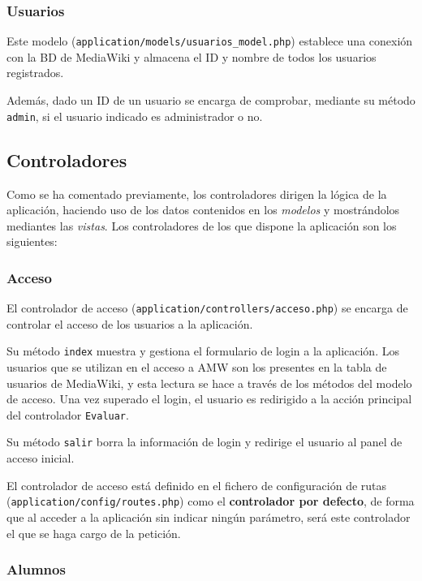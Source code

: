 \documentclass[11pt]{article}
\begin{document}
\subsubsection{Usuarios}

Este modelo (\texttt{application/models/usuarios\_model.php}) establece una
conexión con la BD de MediaWiki y almacena el ID y nombre de todos los usuarios
registrados.

Además, dado un ID de un usuario se encarga de comprobar, mediante su método
\texttt{admin}, si el usuario indicado es administrador o no.


\subsection{Controladores}

Como se ha comentado previamente, los controladores dirigen la lógica de la
aplicación, haciendo uso de los datos contenidos en los \textit{modelos} y
mostrándolos mediantes las \textit{vistas}. Los controladores de los que dispone
la aplicación son los siguientes:

\subsubsection{Acceso}

El controlador de acceso (\texttt{application/controllers/acceso.php}) se
encarga de controlar el acceso de los usuarios a la aplicación. 

Su método \texttt{index} muestra y gestiona el formulario de login a la
aplicación. Los usuarios que se utilizan en el acceso a AMW son los presentes en
la tabla de usuarios de MediaWiki, y esta lectura se hace a través de los
métodos del modelo de acceso. Una vez superado el login, el usuario es
redirigido a la acción principal del controlador \texttt{Evaluar}.

Su método \texttt{salir} borra la información de login y redirige el usuario al
panel de acceso inicial.

El controlador de acceso está definido en el fichero de configuración de rutas
(\texttt{application/config/routes.php}) como el \textbf{controlador por
  defecto}, de forma que al acceder a la aplicación sin indicar ningún
parámetro, será este controlador el que se haga cargo de la petición.

\subsubsection{Alumnos}
\end{document}
